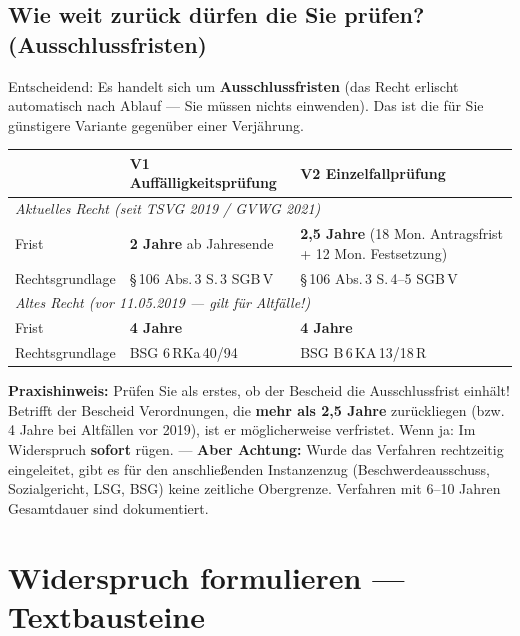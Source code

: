 \documentclass[a4paper]{umbruch-position}
\begin{document}
\subsection*{Wie weit zur\"uck d\"urfen die Sie pr\"ufen? (Ausschlussfristen)}

Entscheidend: Es handelt sich um \textbf{Ausschlussfristen} (das Recht erlischt automatisch nach Ablauf --- Sie m\"ussen nichts einwenden). Das ist die f\"ur Sie g\"unstigere Variante gegen\"uber einer Verj\"ahrung.

{\small
\begin{tabularx}{\textwidth}{l X X}
\toprule
 & \textbf{V1 Auff\"alligkeitspr\"ufung} & \textbf{V2 Einzelfallpr\"ufung} \\
\midrule
\multicolumn{3}{l}{\textit{Aktuelles Recht (seit TSVG 2019 / GVWG 2021)}} \\
\addlinespace[2pt]
Frist & \textbf{2 Jahre} ab Jahresende & \textbf{2,5 Jahre} (18 Mon. Antragsfrist + 12 Mon. Festsetzung) \\
\addlinespace
Rechtsgrundlage & \S\,106 Abs.\,3 S.\,3 SGB\,V & \S\,106 Abs.\,3 S.\,4--5 SGB\,V \\
\midrule
\multicolumn{3}{l}{\textit{Altes Recht (vor 11.05.2019 --- gilt f\"ur Altf\"alle!)}} \\
\addlinespace[2pt]
Frist & \textbf{4 Jahre} & \textbf{4 Jahre} \\
\addlinespace
Rechtsgrundlage & BSG 6\,RKa\,40/94 & BSG B\,6\,KA\,13/18\,R \\
\bottomrule
\end{tabularx}
}

\begin{infobox}
\textbf{Praxishinweis:} Pr\"ufen Sie als erstes, ob der Bescheid die Ausschlussfrist einhält! Betrifft der Bescheid Verordnungen, die \textbf{mehr als 2,5 Jahre} zur\"uckliegen (bzw. 4 Jahre bei Altf\"allen vor 2019), ist er m\"oglicherweise verfristet. Wenn ja: Im Widerspruch \textbf{sofort} r\"ugen. --- \textbf{Aber Achtung:} Wurde das Verfahren rechtzeitig eingeleitet, gibt es f\"ur den anschlie\ss{}enden Instanzenzug (Beschwerdeausschuss, Sozialgericht, LSG, BSG) keine zeitliche Obergrenze. Verfahren mit 6--10 Jahren Gesamtdauer sind dokumentiert.
\end{infobox}

\section{Widerspruch formulieren --- Textbausteine}
\end{document}
